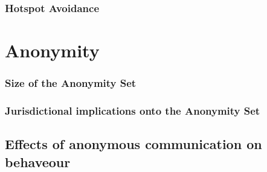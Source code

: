 \subsection{Hotspot Avoidance}


\chapter{Anonymity}

\subsection{Size of the Anonymity Set}

\subsection{Jurisdictional implications onto the Anonymity Set}

\section{Effects of anonymous communication on behaveour}


